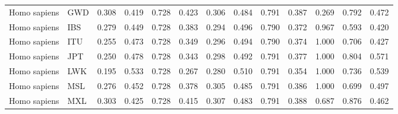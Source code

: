 \begin{longtable}{llrrrrrrrrrrr}
        Homo sapiens &                       GWD &                              0.308 &                               0.419 &                 0.728 &                 0.423 &                              0.306 &                               0.484 &                 0.791 &                 0.387 &         0.269 &  0.792 &  0.472 \\
        Homo sapiens &                       IBS &                              0.279 &                               0.449 &                 0.728 &                 0.383 &                              0.294 &                               0.496 &                 0.790 &                 0.372 &         0.967 &  0.593 &  0.420 \\
        Homo sapiens &                       ITU &                              0.255 &                               0.473 &                 0.728 &                 0.349 &                              0.296 &                               0.494 &                 0.790 &                 0.374 &         1.000 &  0.706 &  0.427 \\
        Homo sapiens &                       JPT &                              0.250 &                               0.478 &                 0.728 &                 0.343 &                              0.298 &                               0.492 &                 0.791 &                 0.377 &         1.000 &  0.804 &  0.571 \\
        Homo sapiens &                       LWK &                              0.195 &                               0.533 &                 0.728 &                 0.267 &                              0.280 &                               0.510 &                 0.791 &                 0.354 &         1.000 &  0.736 &  0.539 \\
        Homo sapiens &                       MSL &                              0.276 &                               0.452 &                 0.728 &                 0.378 &                              0.305 &                               0.485 &                 0.791 &                 0.386 &         1.000 &  0.699 &  0.497 \\
        Homo sapiens &                       MXL &                              0.303 &                               0.425 &                 0.728 &                 0.415 &                              0.307 &                               0.483 &                 0.791 &                 0.388 &         0.687 &  0.876 &  0.462 \\

\end{longtable}
